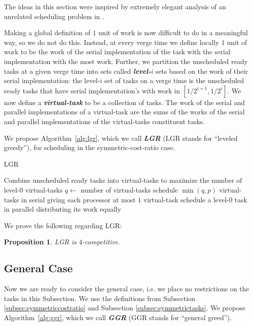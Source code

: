 \documentclass[twocolumn]{article}[10pt]
\newcommand{\defn}[1]{{\textit{\textbf{\boldmath #1}}}\xspace}
\newtheorem{proposition}{Proposition}
\begin{document}
The ideas in this section were inspired by extremely elegant
analysis of an unrelated scheduling problem in \cite{bamboo20}.

Making a global definition of $1$ unit of work is now difficult
to do in a meaningful way, so we do not do this. Instead, at
every verge time we define locally $1$ unit of work to be the
work of the serial implementation of the task with the serial
implementation with the most work. 
Further, we partition the unscheduled ready tasks at a given verge time into
sets called \defn{level-$i$} sets based on the work of their serial
implementation: the level-$i$ set of tasks on a verge time is the
unscheduled ready tasks that have serial implementation's with
work in $[1/2^{i+1}, 1/2^{i}]$.
We now define a \defn{virtual-task} to be a collection of tasks.
The work of the serial and parallel implementations of a
virtual-task are the sums of the works of the serial and parallel
implementations of the virtual-tasks constituent tasks.

We propose Algorithm~\ref{alg:lgr}, which we call \defn{LGR}
(LGR stands for \enquote{leveled greedy}),
for scheduling in the symmetric-cost-ratio case.

\begin{algorithm}
  \caption{LGR}
  \label{alg:lgr}
  \begin{algorithmic}
        \State Combine unscheduled ready tasks into virtual-tasks
        to maximize the number of level-$0$ virtual-tasks
        \State $q \gets $ number of virtual-tasks 
          \State schedule $\min(q, p)$ virtual-tasks in serial
          \State giving each processor at most $1$ virtual-task
        \Else
          \State schedule a level-$0$ task in parallel
          \State distributing its work equally 
        \EndIf
      \EndIf
    \EndWhile
  \end{algorithmic}
\end{algorithm}

We prove the following regarding LGR:

\begin{proposition}
  LGR is $4$-competitive.
\end{proposition}


\subsection{General Case}
Now we are ready to consider the general case, i.e. we place no
restrictions on the tasks in this Subsection.
We use the definitions from Subsection
\ref{subsec:symmetriccostratio} and Subsection
\ref{subsec:symmetrictasks}.
We propose Algorithm~\ref{alg:ggr}, which we call
\defn{GGR} (GGR stands for \enquote{general greed}).
\end{document}
